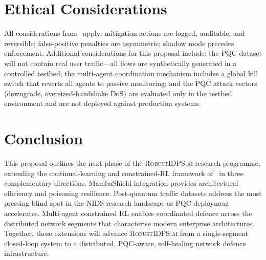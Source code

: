 \documentclass[12pt,a4paper]{article}
\newcommand{\RobustIDPS}{\textsc{RobustIDPS.ai}}
\theoremstyle{definition}
\begin{document}
\section{Ethical Considerations}
\label{sec:ethics}

All considerations from~\cite{anaedevha2026cl_rl} apply: mitigation actions are logged, auditable, and reversible; false-positive penalties are asymmetric; shadow mode precedes enforcement. Additional considerations for this proposal include: the PQC dataset will not contain real user traffic---all flows are synthetically generated in a controlled testbed; the multi-agent coordination mechanism includes a global kill switch that reverts all agents to passive monitoring; and the PQC attack vectors (downgrade, oversized-handshake DoS) are evaluated only in the testbed environment and are not deployed against production systems.

\section{Conclusion}
\label{sec:conclusion}

This proposal outlines the next phase of the \RobustIDPS{} research programme, extending the continual-learning and constrained-RL framework of~\cite{anaedevha2026cl_rl} in three complementary directions. MambaShield integration provides architectural efficiency and poisoning resilience. Post-quantum traffic datasets address the most pressing blind spot in the NIDS research landscape as PQC deployment accelerates. Multi-agent constrained RL enables coordinated defence across the distributed network segments that characterise modern enterprise architectures. Together, these extensions will advance \RobustIDPS{} from a single-segment closed-loop system to a distributed, PQC-aware, self-healing network defence infrastructure.
\end{document}

